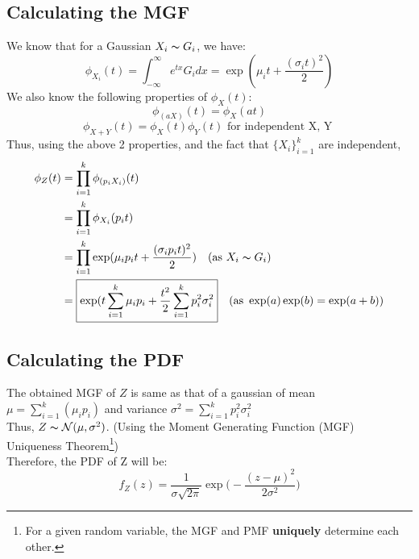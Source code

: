 \documentclass[11pt, fleqn]{article}
\begin{document}
\subsection*{Calculating the MGF}
We know that for a Gaussian $X_i \thicksim G_i$, we have:
$$ \phi_{X_{i}} (t) = \int_{-\infty}^{\infty}e^{tx} G_i dx = \exp(\mu_i t + \frac{(\sigma_i t)^2}{2}) $$
We also know the following properties of $\phi_{X}(t)$:
$$ \phi_{(aX)}(t) = \phi_{X}(at) $$
$$ \phi_{X+Y}(t) =  \phi_{X}(t) \phi_{Y}(t) \text{ for independent X, Y }$$
Thus, using the above 2 properties, and the fact that $\{ X_i\}_{i=1}^k$ are independent,
$$
\begin{aligned}
    \phi_{Z}(t) &= \prod_{i=1}^{k}\phi_{(p_iX_i)}(t)\\
    &= \prod_{i=1}^{k}\phi_{X_i}(p_it)\\
    &= \prod_{i=1}^{k}\exp(\mu_i p_i t + \frac{(\sigma_i p_i t)^2}{2}) \hspace{1em} (\text{as } X_i \thicksim G_i ) \\
    &= \boxed{\exp(t\sum_{i=1}^k\mu_i p_i + \frac{t^2}{2}\sum_{i=1}^{k}p_i^2\sigma_i^2} \hspace{1em} (\text{as } \exp(a)\exp(b) = \exp(a+b)) 
\end{aligned}
$$
\subsection*{Calculating the PDF}
The obtained MGF of $Z$ is same as that of a gaussian of mean $\mu = \sum_{i=1}^k(\mu_i p_i)$ and variance $\sigma^2 = \sum_{i=1}^{k}p_i^2\sigma_i^2$\\
Thus, $Z \thicksim \mathcal{N}(\mu, \sigma^2)$. (Using the Moment Generating Function (MGF) Uniqueness Theorem\footnote{For a given random variable, the MGF and PMF \textbf{uniquely} determine each other.})\\
Therefore, the PDF of Z will be:
$$ \boxed{f_Z(z) = \frac{1}{\sigma \sqrt{2\pi}} \exp\bigg(-\frac{(z-\mu)^2}{2\sigma^2}\bigg)} $$


\newpage
\end{document}
